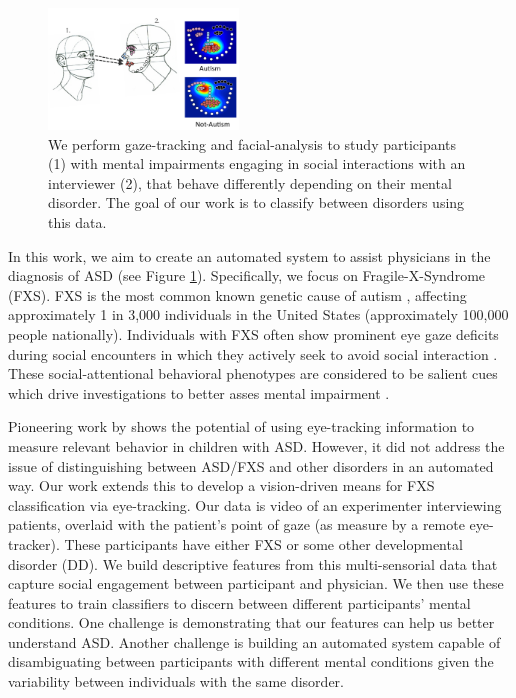 \documentclass[10pt,twocolumn,letterpaper]{article}
\begin{document}
\begin{figure}[ht]   
\includegraphics[width=0.45\textwidth]{figures/Pull.png}
\caption{We perform gaze-tracking and facial-analysis to study participants (1) with mental impairments engaging in social interactions with an interviewer (2), that behave differently depending on their mental disorder. The goal of our work is to classify between disorders using this data.}
\label{fig:pull_figure}
\end{figure} 

In this work, we aim to create an automated system to assist physicians in the diagnosis of ASD (see Figure \ref{fig:pull_figure}). Specifically, we focus on Fragile-X-Syndrome (FXS). FXS is the most common known genetic cause of autism \cite{Hagerman:2008wg}, affecting approximately 1 in 3,000 individuals in the United States (approximately 100,000 people nationally). Individuals with FXS often show prominent eye gaze deficits during social encounters in which they actively seek to avoid social interaction \cite{Cohen:1988vx,Cohen:1989cm}. These social-attentional behavioral phenotypes are considered to be salient cues which drive investigations to better asses mental impairment \cite{Kennedy:2001dg}. 
   
Pioneering work by \cite{Rehg} shows the potential of using eye-tracking information to measure relevant behavior in children with ASD. However, it did not address the issue of distinguishing between ASD/FXS and other disorders in an automated way. Our work extends this to develop a vision-driven means for FXS classification via eye-tracking. Our data is video of an experimenter interviewing patients, overlaid with the patient's point of gaze (as measure by a remote eye-tracker). These participants have either FXS or some other developmental disorder (DD). We build descriptive features from this multi-sensorial data that capture social engagement between participant and physician. We then use these features to train classifiers to discern between different participants' mental conditions. One challenge is demonstrating that our features can help us better understand ASD. Another challenge is building an automated system capable of disambiguating between participants with different mental conditions given the variability between individuals with the same disorder. 
\end{document}
